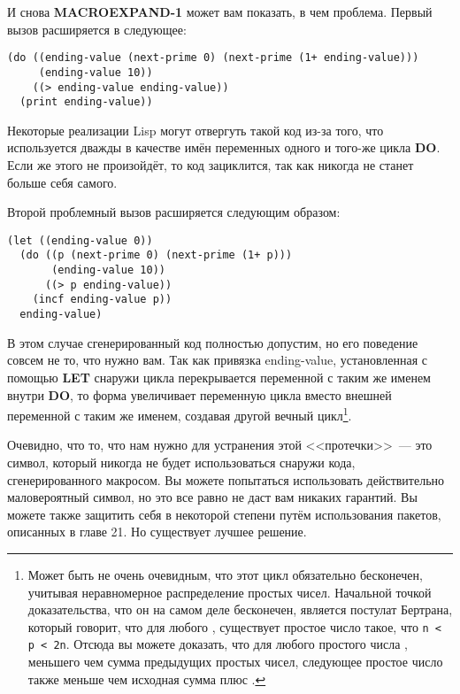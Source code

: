 И снова \textbf{MACROEXPAND-1} может вам показать, в чем проблема. Первый вызов
расширяется в следующее:

\begin{lstlisting}
(do ((ending-value (next-prime 0) (next-prime (1+ ending-value)))
     (ending-value 10))
    ((> ending-value ending-value))
  (print ending-value))
\end{lstlisting}

Некоторые реализации Lisp могут отвергуть такой код из-за того, что 
используется дважды в качестве имён переменных одного и того-же цикла \textbf{DO}. Если же
этого не произойдёт, то код зациклится, так как  никогда не станет
больше себя самого.

Второй проблемный вызов расширяется следующим образом:

\begin{lstlisting}
(let ((ending-value 0))
  (do ((p (next-prime 0) (next-prime (1+ p)))
       (ending-value 10))
      ((> p ending-value))
    (incf ending-value p))
  ending-value)
\end{lstlisting}

В этом случае сгенерированный код полностью допустим, но его поведение совсем не то, что
нужно вам. Так как привязка ending-value, установленная с помощью \textbf{LET} снаружи
цикла перекрывается переменной с таким же именем внутри \textbf{DO}, то форма  увеличивает переменную цикла  вместо внешней
переменной с таким же именем, создавая другой вечный цикл\footnote{Может быть не очень
  очевидным, что этот цикл обязательно бесконечен, учитывая неравномерное распределение
  простых чисел. Начальной точкой доказательства, что он на самом деле бесконечен,
  является постулат Бертрана, который говорит, что для любого , существует
  простое число  такое, что \lstinline!n < p < 2n!. Отсюда вы можете доказать, что
  для любого простого числа , меньшего чем сумма предыдущих простых чисел,
  следующее простое число  также меньше чем исходная сумма плюс .}.

Очевидно, что то, что нам нужно для устранения этой <<протечки>>~--- это символ, который
никогда не будет использоваться снаружи кода, сгенерированного макросом. Вы можете
попытаться использовать действительно маловероятный символ, но это все равно не даст вам
никаких гарантий. Вы можете также защитить себя в некоторой степени путём использования
пакетов, описанных в главе 21. Но существует лучшее решение.

